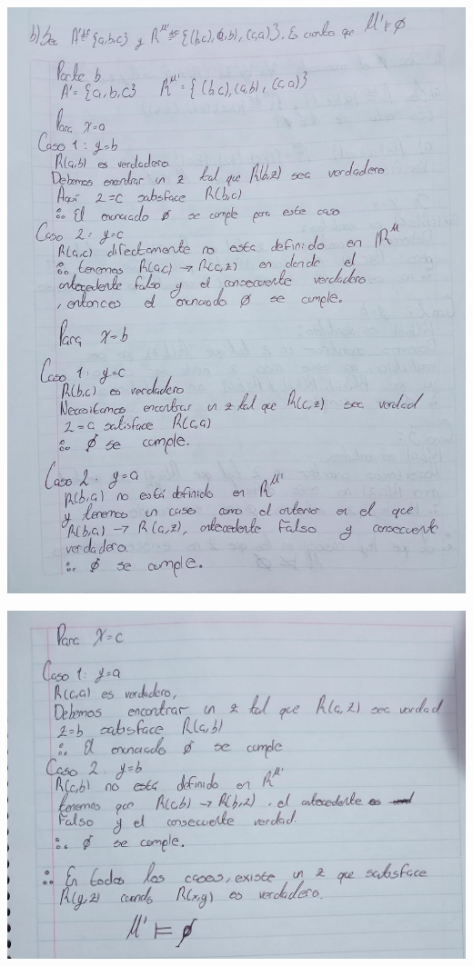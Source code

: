 \documentclass[12pt,letterpaper]{article}
\begin{document}
\begin{enumerate}
  \begin{center}
    \hspace{-1.2cm} \includegraphics[width=\textwidth,height=1.1\textheight,keepaspectratio]{ejercicio5b.png}
  \end{center}

  \begin{center}
    \hspace{-1.2cm} \includegraphics[width=\textwidth,height=0.8\textheight,keepaspectratio]{ejercicio5c.png}
  \end{center}


\end{enumerate}
\end{document}
